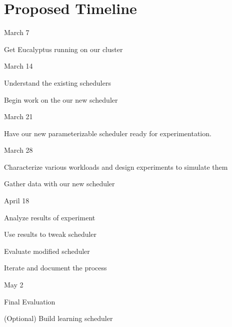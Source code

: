 \section{Proposed Timeline}
\begin{itemize*}
\item{March 7}
\begin{itemize*}
  \item Get Eucalyptus running on our cluster
\end{itemize*}

\item{March 14}
\begin{itemize*}
  \item Understand the existing schedulers
  \item Begin work on the our new scheduler
\end{itemize*}

\item{March 21}
\begin{itemize*}
  \item Have our new parameterizable scheduler ready for experimentation.
\end{itemize*}

\item{March 28}
\begin{itemize*}
  \item Characterize various workloads and design experiments to simulate them
  \item Gather data with our new scheduler
\end{itemize*}

\item{April 18}
\begin{itemize*}
  \item Analyze results of experiment
  \item Use results to tweak scheduler
  \item Evaluate modified scheduler
  \item Iterate and document the process
\end{itemize*}

\item{May 2}
\begin{itemize*}
  \item Final Evaluation
  \item (Optional) Build learning scheduler
\end{itemize*}
\end{itemize*}
